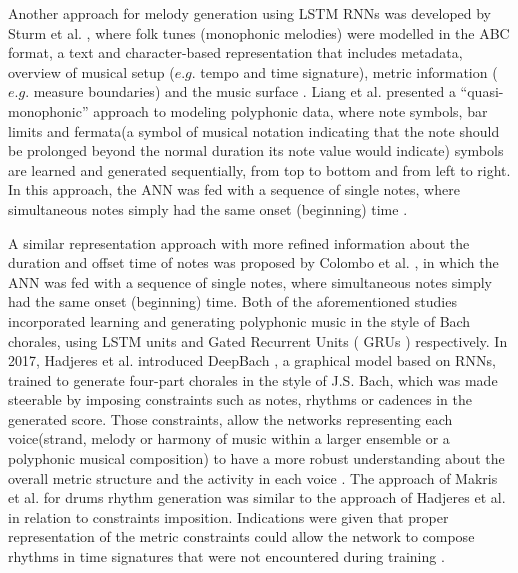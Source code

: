         Another approach for melody generation using LSTM RNNs was developed by Sturm et al. \cite{sturm2015folk}, where folk tunes (monophonic melodies) were modelled in the ABC format, a text and character-based representation that includes metadata, overview of musical setup ($e.g.$ tempo and time signature), metric information ($e.g.$ measure boundaries) and the music surface \cite{maxim_kal_pap_book}. Liang et al. presented a “quasi-monophonic” approach to modeling polyphonic data, where note symbols, bar limits and fermata(a symbol of musical notation indicating that the note should be prolonged beyond the normal duration its note value would indicate) symbols are learned and generated sequentially, from top to bottom and from left to right. In this approach, the ANN was fed with a sequence of single notes, where simultaneous notes simply had the same onset (beginning) time \cite{liang2017automatic}. 

        A similar representation approach with more refined information about the duration and offset time of notes was proposed by Colombo et al. \cite{colombo2018learning}, in which the ANN was fed with a sequence of single notes, where simultaneous notes simply had the same onset (beginning) time. Both of the aforementioned studies incorporated learning and generating polyphonic music in the style of Bach chorales, using LSTM units and Gated Recurrent Units ( GRUs ) respectively. In 2017, Hadjeres et al. introduced DeepBach \cite{hadjeres2017deepbach}, a graphical model based on RNNs, trained to generate four-part chorales in the style of J.S. Bach, which was made steerable by imposing constraints such as notes, rhythms or cadences in the generated score. Those constraints, allow the networks representing each voice(strand, melody or harmony of music within a larger ensemble or a polyphonic musical composition) to have a more robust understanding about the overall metric structure and the activity in each voice \cite{maxim_kal_pap_book}. The approach of Makris et al. for drums rhythm generation was similar to the approach of Hadjeres et al. \cite{hadjeres2017deepbach} in relation to constraints imposition. Indications were given that proper representation of the metric constraints could allow the network to compose rhythms in time signatures that were not encountered during training \cite{maxim_kal_pap_book}. 

